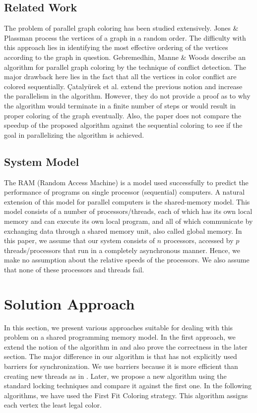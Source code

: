 \documentclass[a4paper,11pt]{article}
\begin{document}
\subsection{Related Work}
The problem of parallel graph coloring has been studied extensively. Jones \& Plassman \cite{DBLP:journals/siamsc/JonesP93} process the vertices of a graph in a random order. The difficulty with this approach lies in identifying the most effective ordering of the vertices according to the graph in question. Gebremedhin, Manne \& Woods  \cite{gebremedhin2006speeding} describe an algorithm for parallel graph coloring by the technique of conflict detection. The major drawback here lies in the fact that all the vertices in color conflict are colored sequentially. {\c{C}}ataly{\"{u}}rek et al. \cite{DBLP:journals/pc/CatalyurekFGHP12} extend the previous notion and increase the parallelism in the algorithm. However, they do not provide a proof as to why the algorithm would terminate in a finite number of steps or would result in proper coloring of the graph eventually. Also, the paper does not compare the speedup of the proposed algorithm against the sequential coloring to see if the goal in parallelizing the algorithm is achieved.
\subsection{System Model}
The RAM (Random Access Machine) is a model used successfully to predict the performance of programs on single processor (sequential) computers. A natural extension of this model for parallel computers is the shared-memory model. This model consists of a number of processors/threads, each of which has its own local memory and can execute its own local program, and all of which communicate by exchanging data through a shared memory unit, also called global memory. In this paper, we assume that our system consists of $n$ processors, accessed by $p$ threads/processors that run in a completely asynchronous manner. Hence, we make no assumption about the relative speeds of the processors. We also assume that none of these processors and threads fail.

\section{Solution Approach}
In this section, we present various approaches suitable for dealing with this problem on a shared programming memory model. In the first approach, we extend the notion of the algorithm in \cite{DBLP:journals/pc/CatalyurekFGHP12} and also prove the correctness in the later section. The major difference in our algorithm is that \cite{DBLP:journals/pc/CatalyurekFGHP12} has not explicitly used barriers for synchronization. We use barriers because it is more efficient than creating new threads as in \cite{DBLP:journals/pc/CatalyurekFGHP12}. Later, we propose a new algorithm using the standard locking techniques and compare it against the first one. In the following algorithms, we have used the First Fit Coloring strategy. This algorithm assigns each vertex the least legal color.
\end{document}
